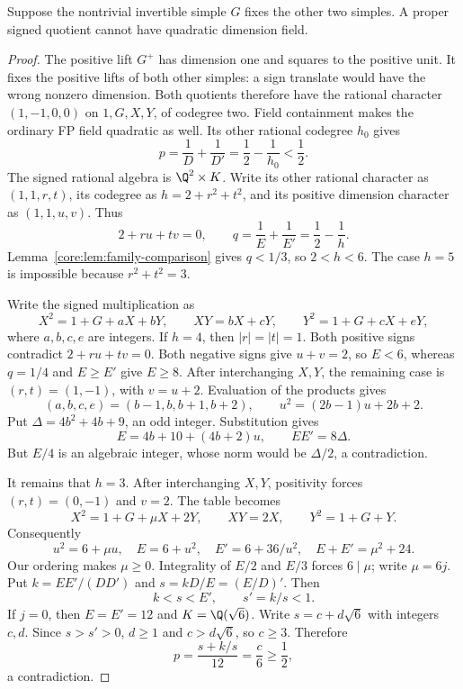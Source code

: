 \begin{lemma}
\label{inv:lem:fixed-invertible-quadratic}
Suppose the nontrivial invertible simple $G$ fixes the other two
simples. A proper signed quotient cannot have quadratic dimension
field.
\end{lemma}
\begin{proof}
The positive lift $G^+$ has dimension one and squares to the positive
unit. It fixes the positive lifts of both other simples: a sign
translate would have the wrong nonzero dimension. Both quotients
therefore have the rational character $(1,-1,0,0)$ on $1,G,X,Y$,
of codegree two. Field containment makes the ordinary FP field
quadratic as well. Its other rational codegree $h_0$ gives
\[
 p=\frac1D+\frac1{D'}=\frac12-\frac1{h_0}<\frac12.
\]
The signed rational algebra is $\Q^2\times K$. Write its
other rational character as $(1,1,r,t)$, its codegree as
$h=2+r^2+t^2$, and its positive dimension character as $(1,1,u,v)$.
Thus
\[
 2+ru+tv=0,\qquad
 q=\frac1E+\frac1{E'}=\frac12-\frac1h.
\]
Lemma~\ref{core:lem:family-comparison} gives $q<1/3$, so
$2<h<6$. The case $h=5$ is impossible because $r^2+t^2=3$.

Write the signed multiplication as
\[
 X^2=1+G+aX+bY,\qquad XY=bX+cY,\qquad
 Y^2=1+G+cX+eY,
\]
where $a,b,c,e$ are integers.
If $h=4$, then $|r|=|t|=1$. Both positive signs contradict
$2+ru+tv=0$. Both negative signs give $u+v=2$, so $E<6$, whereas
$q=1/4$ and $E\geq E'$ give $E\geq8$. After interchanging $X,Y$,
the remaining case is $(r,t)=(1,-1)$, with $v=u+2$. Evaluation of
the products gives
\[
 (a,b,c,e)=(b-1,b,b+1,b+2),\qquad
 u^2=(2b-1)u+2b+2.
\]
Put $\Delta=4b^2+4b+9$, an odd integer. Substitution gives
\[
 E=4b+10+(4b+2)u,\qquad EE'=8\Delta.
\]
But $E/4$ is an algebraic integer, whose norm would be
$\Delta/2$, a contradiction.

It remains that $h=3$. After interchanging $X,Y$, positivity forces
$(r,t)=(0,-1)$ and $v=2$. The table becomes
\[
 X^2=1+G+\mu X+2Y,\qquad XY=2X,\qquad Y^2=1+G+Y.
\]
Consequently
\[
 u^2=6+\mu u,\quad E=6+u^2,\quad E'=6+36/u^2,
 \quad E+E'=\mu^2+24.
\]
Our ordering makes $\mu\geq0$. Integrality of $E/2$ and $E/3$
forces $6\mid\mu$; write $\mu=6j$.
Put $k=EE'/(DD')$ and
$s=kD/E=(E/D)'$. Then
\[
 k<s<E',\qquad s'=k/s<1.
\]
If $j=0$, then $E=E'=12$ and $K=\Q(\sqrt6)$.
Write $s=c+d\sqrt6$ with integers $c,d$. Since $s>s'>0$,
$d\geq1$ and $c>d\sqrt6$, so $c\geq3$. Therefore
\[
 p=\frac{s+k/s}{12}=\frac c6\geq\frac12,
\]
a contradiction.


\end{proof}
